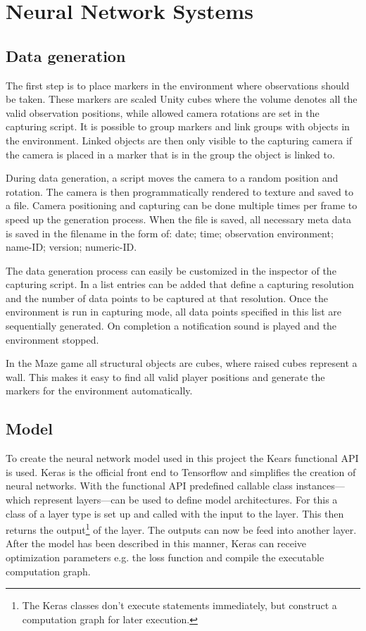 
\chapter{Neural Network Systems}\label{NeuralNetworkSystems}
\section{Data generation}\label{DataGeneration}
The first step is to place markers in the environment where observations should be taken. These markers are scaled Unity cubes where the volume denotes all the valid observation positions, while allowed camera rotations are set in the capturing script. It is possible to group markers and link groups with objects in the environment. Linked objects are then only visible to the capturing camera if the camera is placed in a marker that is in the group the object is linked to.

During data generation, a script moves the camera to a random position and rotation. The camera is then programmatically rendered to texture and saved to a file. Camera positioning and capturing can be done multiple times per frame to speed up the generation process. When the file is saved, all necessary meta data is saved in the filename in the form of: date; time; observation environment; name-ID; version; numeric-ID.

The data generation process can easily be customized in the inspector of the capturing script. In a list entries can be added that define a capturing resolution and the number of data points to be captured at that resolution. Once the environment is run in capturing mode, all data points specified in this list are sequentially generated. On completion a notification sound is played and the environment stopped.

In the Maze game all structural objects are cubes, where raised cubes represent a wall. This makes it easy to find all valid player positions and generate the markers for the environment automatically.


\section{Model}
To create the neural network model used in this project the Kears functional API is used. Keras is the official front end to Tensorflow and simplifies the creation of neural networks. With the functional API predefined callable class instances---which represent layers---can be used to define model architectures. For this a class of a layer type is set up and called with the input to the layer. This then returns the output\footnote{The Keras classes don't execute statements immediately, but construct a computation graph for later execution.} of the layer. The outputs can now be feed into another layer. After the model has been described in this manner, Keras can receive optimization parameters e.g. the loss function and compile the executable computation graph.

